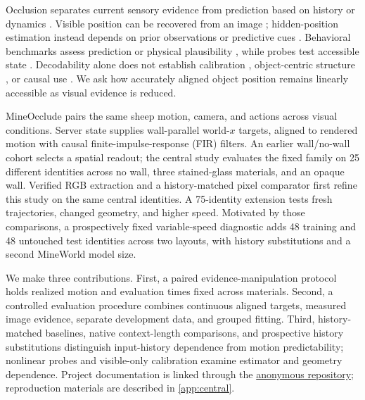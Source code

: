 \documentclass{article}
\begin{document}
Occlusion separates current sensory evidence from prediction based on history or dynamics \citep{riochet2018intphys,weihs2022benchmarking,piloto2022intuitive,garrido2025intuitive,upadhyay2026worldbench}. Visible position can be recovered from an image \citep{chen2023beyond,zhang2026whatdo}; hidden-position estimation instead depends on prior observations or predictive cues \citep{kalman1960new,gordon1993novel,newell2025comotion,shai2024transformers}. Behavioral benchmarks assess prediction or physical plausibility \citep{yi2020clevrer,tung2023physionpp,gu2025geco}, while probes test accessible state \citep{alain2017understanding,li2023emergent,nanda2023emergent,joseph2026interpreting}. Decodability alone does not establish calibration \citep{guo2017calibration,mei2026world}, object-centric structure \citep{battaglia2016interaction,kipf2020contrastive}, or causal use \citep{hewitt2019designing,belinkov2022probing,elazar2021amnesic,geiger2024finding,alam2026causal}. We ask how accurately aligned object position remains linearly accessible as visual evidence is reduced.

MineOcclude pairs the same sheep motion, camera, and actions across visual conditions. Server state supplies wall-parallel world-$x$ targets, aligned to rendered motion with causal finite-impulse-response (FIR) filters. An earlier wall/no-wall cohort selects a spatial readout; the central study evaluates the fixed family on 25 different identities across no wall, three stained-glass materials, and an opaque wall. Verified RGB extraction and a history-matched pixel comparator first refine this study on the same central identities. A 75-identity extension tests fresh trajectories, changed geometry, and higher speed. Motivated by those comparisons, a prospectively fixed variable-speed diagnostic adds 48 training and 48 untouched test identities across two layouts, with history substitutions and a second MineWorld model size.

We make three contributions. First, a paired evidence-manipulation protocol holds realized motion and evaluation times fixed across materials. Second, a controlled evaluation procedure combines continuous aligned targets, measured image evidence, separate development data, and grouped fitting. Third, history-matched baselines, native context-length comparisons, and prospective history substitutions distinguish input-history dependence from motion predictability; nonlinear probes and visible-only calibration examine estimator and geometry dependence. Project documentation is linked through the \href{https://anonymous.4open.science/r/MineOcclude-5503/}{\textcolor{blue!70!black}{anonymous repository}}; reproduction materials are described in \autoref{app:central}.
\end{document}
